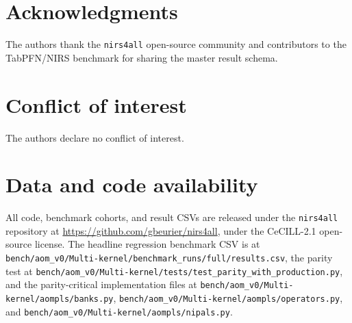 \documentclass[review,a4paper]{elsarticle}
\newcommand{\nirsfourall}{\texttt{nirs4all}\xspace}
\begin{document}
\section*{Acknowledgments}
The authors thank the \nirsfourall open-source community and contributors
to the TabPFN/NIRS benchmark for sharing the master result schema.

\section*{Conflict of interest}
The authors declare no conflict of interest.

\section*{Data and code availability}
All code, benchmark cohorts, and result CSVs are released under the
\nirsfourall repository at \url{https://github.com/gbeurier/nirs4all},
under the CeCILL-2.1 open-source license. The headline regression
benchmark CSV is at
\verb|bench/aom_v0/Multi-kernel/benchmark_runs/full/results.csv|, the parity test
at \verb|bench/aom_v0/Multi-kernel/tests/test_parity_with_production.py|, and the
parity-critical implementation files at
\verb|bench/aom_v0/Multi-kernel/aompls/banks.py|,
\verb|bench/aom_v0/Multi-kernel/aompls/operators.py|, and
\verb|bench/aom_v0/Multi-kernel/aompls/nipals.py|.



\end{document}
